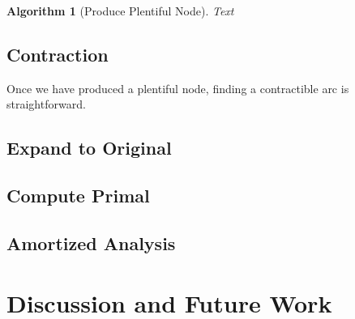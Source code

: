 \documentclass{article}
\newtheorem{alg}[theorem]{Algorithm}
\begin{document}
\begin{alg}[Produce Plentiful Node]
Text
\end{alg}

    \subsection{Contraction}
Once we have produced a plentiful node, finding a contractible arc is straightforward. 
    \subsection{Expand to Original}
    \subsection{Compute Primal}
    \subsection{Amortized Analysis}
\section{Discussion and Future Work}

\nocite{*}
\printbibliography
\end{document}
